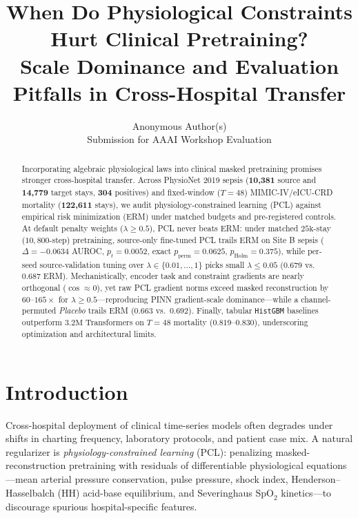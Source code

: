 \documentclass[10pt,twocolumn]{article}
\title{\textbf{When Do Physiological Constraints Hurt Clinical Pretraining?}\\
\large Scale Dominance and Evaluation Pitfalls in Cross-Hospital Transfer}
\author{Anonymous Author(s) \\
\small Submission for AAAI Workshop Evaluation}
\date{}
\begin{document}
\maketitle

\begin{abstract}
Incorporating algebraic physiological laws into clinical masked pretraining promises stronger cross-hospital transfer. Across PhysioNet 2019 sepsis (\textbf{10,381} source and \textbf{14,779} target stays, \textbf{304} positives) and fixed-window ($T=48$) MIMIC-IV/eICU-CRD mortality (\textbf{122,611} stays), we audit physiology-constrained learning (PCL) against empirical risk minimization (ERM) under matched budgets and pre-registered controls. At default penalty weights ($\lambda \ge 0.5$), PCL never beats ERM: under matched $25\text{k}$-stay ($10{,}800$-step) pretraining, source-only fine-tuned PCL trails ERM on Site B sepsis ($\Delta = -0.0634$ AUROC, $p_t = 0.0052$, exact $p_{\mathrm{perm}} = 0.0625$, $p_{\mathrm{Holm}} = 0.375$), while per-seed source-validation tuning over $\lambda \in \{0.01,\dots,1\}$ picks small $\lambda \le 0.05$ ($0.679$ vs.\ $0.687$ ERM). Mechanistically, encoder task and constraint gradients are nearly orthogonal ($\cos \approx 0$), yet raw PCL gradient norms exceed masked reconstruction by $60\text{--}165\times$ for $\lambda \ge 0.5$---reproducing PINN gradient-scale dominance---while a channel-permuted \textit{Placebo} trails ERM ($0.663$ vs.\ $0.692$). Finally, tabular \texttt{HistGBM} baselines outperform $3.2\text{M}$ Transformers on $T=48$ mortality ($0.819$--$0.830$), underscoring optimization and architectural limits.
\end{abstract}

\section{Introduction}
Cross-hospital deployment of clinical time-series models often degrades under shifts in charting frequency, laboratory protocols, and patient case mix. A natural regularizer is \emph{physiology-constrained learning} (PCL): penalizing masked-reconstruction pretraining with residuals of differentiable physiological equations—mean arterial pressure conservation, pulse pressure, shock index, Henderson--Hasselbalch (HH) acid-base equilibrium, and Severinghaus $\text{SpO}_2$ kinetics—to discourage spurious hospital-specific features.
\end{document}
